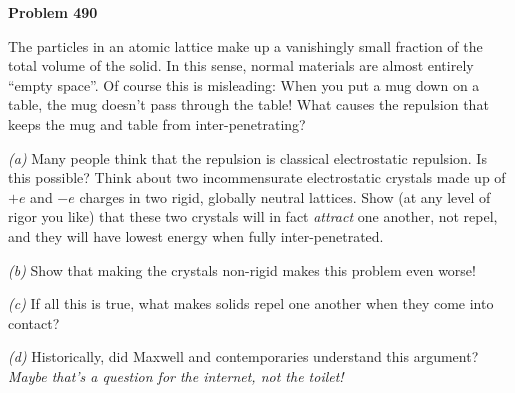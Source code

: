 \documentclass[12pt]{article}
\begin{document}
\begin{pottproblem}
\textbf{Problem 490}

The particles in an atomic lattice make up a vanishingly small fraction
of the total volume of the solid.
In this sense, normal materials are almost entirely ``empty space''.
Of course this is misleading:
When you put a mug down on a table, the mug doesn't pass through the table!
What causes the repulsion that keeps the mug and table from inter-penetrating?

\textsl{(a)} Many people think that the repulsion is classical electrostatic repulsion.
Is this possible?
Think about two incommensurate electrostatic crystals made up of $+e$ and $-e$ charges
in two rigid, globally neutral lattices.
Show (at any level of rigor you like) that these two crystals will in fact \emph{attract}
one another, not repel, and they will have lowest energy when fully inter-penetrated.

\textsl{(b)} Show that making the crystals non-rigid makes this
problem even worse!

\textsl{(c)} If all this is true, what makes solids repel one another when they come into contact?

\textsl{(d)} Historically, did Maxwell and contemporaries understand this argument?
\textit{Maybe that's a question for the internet, not the toilet!}

\end{pottproblem}
\end{document}
